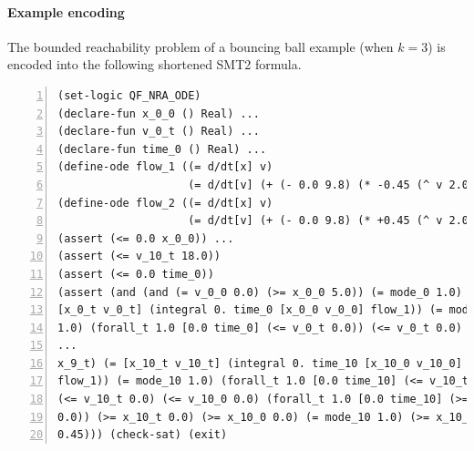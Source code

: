 \paragraph{Example encoding} The bounded reachability problem of a
bouncing ball example (when $k = 3$) is encoded into the following
shortened SMT2 formula.
\begin{Verbatim}[fontfamily=courier, frame=single, framesep=1mm,  numbers=left, fontsize=\scriptsize]
(set-logic QF_NRA_ODE)
(declare-fun x_0_0 () Real) ...
(declare-fun v_0_t () Real) ...
(declare-fun time_0 () Real) ...
(define-ode flow_1 ((= d/dt[x] v)
                    (= d/dt[v] (+ (- 0.0 9.8) (* -0.45 (^ v 2.0))))))
(define-ode flow_2 ((= d/dt[x] v)
                    (= d/dt[v] (+ (- 0.0 9.8) (* +0.45 (^ v 2.0))))))
(assert (<= 0.0 x_0_0)) ...
(assert (<= v_10_t 18.0))
(assert (<= 0.0 time_0))
(assert (and (and (= v_0_0 0.0) (>= x_0_0 5.0)) (= mode_0 1.0) (=
[x_0_t v_0_t] (integral 0. time_0 [x_0_0 v_0_0] flow_1)) (= mode_0
1.0) (forall_t 1.0 [0.0 time_0] (<= v_0_t 0.0)) (<= v_0_t 0.0) (<=
...
x_9_t) (= [x_10_t v_10_t] (integral 0. time_10 [x_10_0 v_10_0]
flow_1)) (= mode_10 1.0) (forall_t 1.0 [0.0 time_10] (<= v_10_t 0.0))
(<= v_10_t 0.0) (<= v_10_0 0.0) (forall_t 1.0 [0.0 time_10] (>= x_10_t
0.0)) (>= x_10_t 0.0) (>= x_10_0 0.0) (= mode_10 1.0) (>= x_10_t
0.45))) (check-sat) (exit)
\end{Verbatim}

